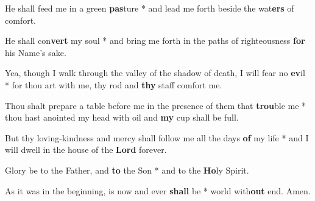 \begin{multicols}{2}
	He shall feed me in a green \textbf{pas}ture * and lead me forth beside the wat\textbf{ers} of comfort.
	
	He shall con\textbf{vert} my soul * and bring me forth in the paths of righteousness \textbf{for} his Name's sake.
	
	Yea, though I walk through the valley of the shadow of death, I will fear no \textbf{ev}il * for thou art with me, thy rod and \textbf{thy} staff comfort me.
	
	Thou shalt prepare a table before me in the presence of them that \textbf{trou}ble me * thou hast anointed my head with oil and \textbf{my} cup shall be full.
	
	But thy loving-kindness and mercy shall follow me all the days \textbf{of} my life * and I will dwell in the house of the \textbf{Lord} forever.
	
	Glory be to the Father, and \textbf{to} the Son * and to the \textbf{Ho}ly Spirit.
	
	As it was in the beginning, is now and ever \textbf{shall} be * world with\textbf{out} end. Amen.
\end{multicols}